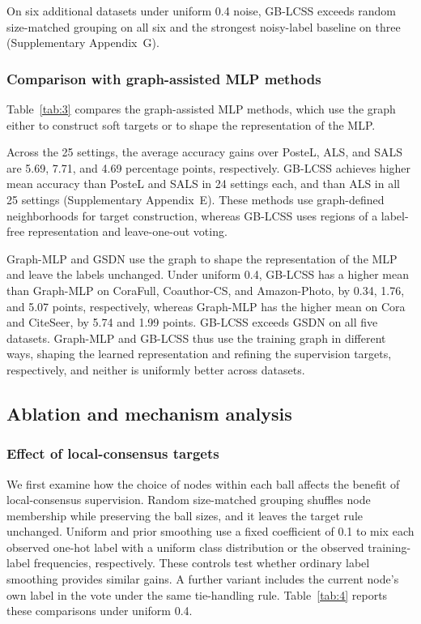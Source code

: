 \documentclass[times,review,10pt]{elsarticle}
\theoremstyle{definition}
\theoremstyle{plain}
\begin{document}
On six additional datasets under uniform 0.4 noise, GB-LCSS exceeds random size-matched grouping on all six and the strongest noisy-label baseline on three (Supplementary Appendix~G).

\subsubsection{Comparison with graph-assisted MLP methods}\label{sec:4.2.2}

Table~\ref{tab:3} compares the graph-assisted MLP methods, which use the graph either to construct soft targets or to shape the representation of the MLP.



Across the 25 settings, the average accuracy gains over PosteL, ALS, and SALS are 5.69, 7.71, and 4.69 percentage points, respectively. GB-LCSS achieves higher mean accuracy than PosteL and SALS in 24 settings each, and than ALS in all 25 settings (Supplementary Appendix~E). These methods use graph-defined neighborhoods for target construction, whereas GB-LCSS uses regions of a label-free representation and leave-one-out voting.

Graph-MLP and GSDN use the graph to shape the representation of the MLP and leave the labels unchanged. Under uniform 0.4, GB-LCSS has a higher mean than Graph-MLP on CoraFull, Coauthor-CS, and Amazon-Photo, by 0.34, 1.76, and 5.07 points, respectively, whereas Graph-MLP has the higher mean on Cora and CiteSeer, by 5.74 and 1.99 points. GB-LCSS exceeds GSDN on all five datasets. Graph-MLP and GB-LCSS thus use the training graph in different ways, shaping the learned representation and refining the supervision targets, respectively, and neither is uniformly better across datasets.

\subsection{Ablation and mechanism analysis}\label{sec:4.3}

\subsubsection{Effect of local-consensus targets}\label{sec:4.3.1}

We first examine how the choice of nodes within each ball affects the benefit of local-consensus supervision. Random size-matched grouping shuffles node membership while preserving the ball sizes, and it leaves the target rule unchanged. Uniform and prior smoothing use a fixed coefficient of 0.1 to mix each observed one-hot label with a uniform class distribution or the observed training-label frequencies, respectively. These controls test whether ordinary label smoothing provides similar gains. A further variant includes the current node's own label in the vote under the same tie-handling rule. Table~\ref{tab:4} reports these comparisons under uniform 0.4.
\end{document}
